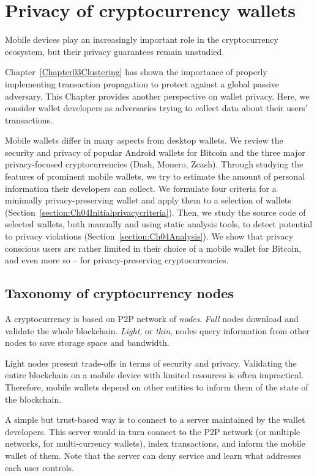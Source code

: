 \chapter{Privacy of cryptocurrency wallets}

\label{Chapter04Wallets}

Mobile devices play an increasingly important role in the cryptocurrency ecosystem, but their privacy guarantees remain unstudied.

Chapter~\ref{Chapter03Clustering} has shown the importance of properly implementing transaction propagation to protect against a global passive adversary.
This Chapter provides another perspective on wallet privacy.
Here, we consider wallet developers as adversaries trying to collect data about their users' transactions.

Mobile wallets differ in many aspects from desktop wallets.
We review the security and privacy of popular Android wallets for Bitcoin and the three major privacy-focused cryptocurrencies (Dash, Monero, Zcash).
Through studying the features of prominent mobile wallets, we try to estimate the amount of personal information their developers can collect.
We formulate four criteria for a minimally privacy-preserving wallet and apply them to a selection of wallets (Section~\ref{section:Ch04Initialprivacycriteria}).
Then, we study the source code of selected wallets, both manually and using static analysis tools, to detect potential to privacy violations (Section~\ref{section:Ch04Analysis}).
We show that privacy conscious users are rather limited in their choice of a mobile wallet for Bitcoin, and even more so -- for privacy-preserving cryptocurrencies.


\section{Taxonomy of cryptocurrency nodes}

A cryptocurrency is based on P2P network of \textit{nodes}.
\textit{Full} nodes download and validate the whole blockchain.
\textit{Light}, or \textit{thin}, nodes query information from other nodes to save storage space and bandwidth.

Light nodes present trade-offs in terms of security and privacy.
Validating the entire blockchain on a mobile device with limited resources is often impractical.
Therefore, mobile wallets depend on other entities to inform them of the state of the blockchain.

A simple but trust-based way is to connect to a server maintained by the wallet developers.
This server would in turn connect to the P2P network (or multiple networks, for multi-currency wallets), index transactions, and inform the mobile wallet of them.
Note that the server can deny service and learn what addresses each user controls.

